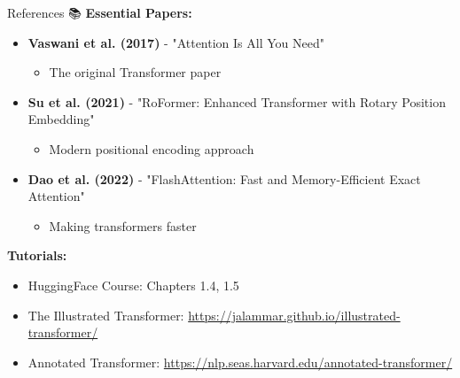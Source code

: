 \documentclass[aspectratio=169]{beamer}
\begin{document}
\begin{frame}[shrink=10]{References 📚}
\textbf{Essential Papers:}

\vspace{0.5em}

\begin{itemize}\setlength{\itemsep}{0pt}
    \item \textbf{Vaswani et al. (2017)} - "Attention Is All You Need"
    \begin{itemize}\setlength{\itemsep}{0pt}
        \item The original Transformer paper
    \end{itemize}

    \item \textbf{Su et al. (2021)} - "RoFormer: Enhanced Transformer with Rotary Position Embedding"
    \begin{itemize}\setlength{\itemsep}{0pt}
        \item Modern positional encoding approach
    \end{itemize}

    \item \textbf{Dao et al. (2022)} - "FlashAttention: Fast and Memory-Efficient Exact Attention"
    \begin{itemize}\setlength{\itemsep}{0pt}
        \item Making transformers faster
    \end{itemize}
\end{itemize}

\vspace{0.5em}

\textbf{Tutorials:}
\begin{itemize}\setlength{\itemsep}{0pt}
    \item HuggingFace Course: Chapters 1.4, 1.5
    \item The Illustrated Transformer: \url{https://jalammar.github.io/illustrated-transformer/}
    \item Annotated Transformer: \url{https://nlp.seas.harvard.edu/annotated-transformer/}
\end{itemize}
\end{frame}
\end{document}
